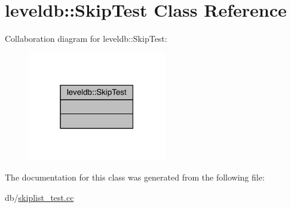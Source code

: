 \hypertarget{classleveldb_1_1_skip_test}{}\section{leveldb\+::Skip\+Test Class Reference}
\label{classleveldb_1_1_skip_test}


Collaboration diagram for leveldb\+::Skip\+Test\+:
\nopagebreak
\begin{figure}[H]
\begin{center}
\leavevmode
\includegraphics[width=171pt]{classleveldb_1_1_skip_test__coll__graph}
\end{center}
\end{figure}


The documentation for this class was generated from the following file\+:\begin{DoxyCompactItemize}
\item 
db/\mbox{\hyperlink{skiplist__test_8cc}{skiplist\+\_\+test.\+cc}}\end{DoxyCompactItemize}

